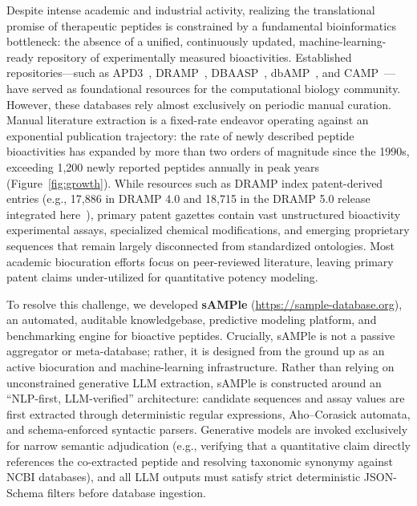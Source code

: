 \documentclass[unnumsec,webpdf,contemporary,large]{oup-authoring-template}%
\begin{document}
Despite intense academic and industrial activity, realizing the translational promise of therapeutic peptides is constrained by a fundamental bioinformatics bottleneck: the absence of a unified, continuously updated, machine-learning-ready repository of experimentally measured bioactivities. Established repositories---such as APD3~\cite{wang2016apd3}, DRAMP~\cite{ma2026dramp}, DBAASP~\cite{pirtskhalava2021dbaasp}, dbAMP~\cite{yao2025dbamp}, and CAMP~\cite{wadhwa2023camp}---have served as foundational resources for the computational biology community. However, these databases rely almost exclusively on periodic manual curation. Manual literature extraction is a fixed-rate endeavor operating against an exponential publication trajectory: the rate of newly described peptide bioactivities has expanded by more than two orders of magnitude since the 1990s, exceeding 1,200 newly reported peptides annually in peak years (Figure~\ref{fig:growth}). While resources such as DRAMP index patent-derived entries (e.g., 17,886 in DRAMP 4.0 and 18,715 in the DRAMP 5.0 release integrated here~\cite{ma2026dramp}), primary patent gazettes contain vast unstructured bioactivity experimental assays, specialized chemical modifications, and emerging proprietary sequences that remain largely disconnected from standardized ontologies. Most academic biocuration efforts focus on peer-reviewed literature, leaving primary patent claims under-utilized for quantitative potency modeling.

To resolve this challenge, we developed \textbf{sAMPle} (\url{https://sample-database.org}), an automated, auditable knowledgebase, predictive modeling platform, and benchmarking engine for bioactive peptides. Crucially, sAMPle is not a passive aggregator or meta-database; rather, it is designed from the ground up as an active biocuration and machine-learning infrastructure. Rather than relying on unconstrained generative LLM extraction, sAMPle is constructed around an ``NLP-first, LLM-verified'' architecture: candidate sequences and assay values are first extracted through deterministic regular expressions, Aho--Corasick automata, and schema-enforced syntactic parsers. Generative models are invoked exclusively for narrow semantic adjudication (e.g., verifying that a quantitative claim directly references the co-extracted peptide and resolving taxonomic synonymy against NCBI databases), and all LLM outputs must satisfy strict deterministic JSON-Schema filters before database ingestion.
\end{document}
